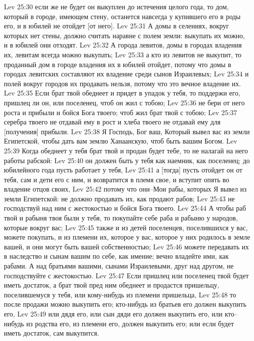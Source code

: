 Lev 25:30  если же не будет он выкуплен до истечения целого года, то дом, который в городе, имеющем стену, останется навсегда у купившего его в роды его, и в юбилей не отойдет [от него].
Lev 25:31  А домы в селениях, вокруг которых нет стены, должно считать наравне с полем земли: выкупать их можно, и в юбилей они отходят.
Lev 25:32  А города левитов, домы в городах владения их, левитам всегда можно выкупать;
Lev 25:33  а кто из левитов не выкупит, то проданный дом в городе владения их в юбилей отойдет, потому что домы в городах левитских составляют их владение среди сынов Израилевых;
Lev 25:34  и полей вокруг городов их продавать нельзя, потому что это вечное владение их.
Lev 25:35  Если брат твой обеднеет и придет в упадок у тебя, то поддержи его, пришлец ли он, или поселенец, чтоб он жил с тобою;
Lev 25:36  не бери от него роста и прибыли и бойся Бога твоего; чтоб жил брат твой с тобою;
Lev 25:37  серебра твоего не отдавай ему в рост и хлеба твоего не отдавай ему для [получения] прибыли.
Lev 25:38  Я Господь, Бог ваш, Который вывел вас из земли Египетской, чтобы дать вам землю Ханаанскую, чтоб быть вашим Богом.
Lev 25:39  Когда обеднеет у тебя брат твой и продан будет тебе, то не налагай на него работы рабской:
Lev 25:40  он должен быть у тебя как наемник, как поселенец; до юбилейного года пусть работает у тебя,
Lev 25:41  а [тогда] пусть отойдет он от тебя, сам и дети его с ним, и возвратится в племя свое, и вступит опять во владение отцов своих,
Lev 25:42  потому что они--Мои рабы, которых Я вывел из земли Египетской: не должно продавать их, как продают рабов;
Lev 25:43  не господствуй над ним с жестокостью и бойся Бога твоего.
Lev 25:44  А чтобы раб твой и рабыня твоя были у тебя, то покупайте себе раба и рабыню у народов, которые вокруг вас;
Lev 25:45  также и из детей поселенцев, поселившихся у вас, можете покупать, и из племени их, которое у вас, которое у них родилось в земле вашей, и они могут быть вашей собственностью;
Lev 25:46  можете передавать их в наследство и сынам вашим по себе, как имение; вечно владейте ими, как рабами. А над братьями вашими, сынами Израилевыми, друг над другом, не господствуйте с жестокостью.
Lev 25:47  Если пришлец или поселенец твой будет иметь достаток, а брат твой пред ним обеднеет и продастся пришельцу, поселившемуся у тебя, или кому-нибудь из племени пришельца,
Lev 25:48  то после продажи можно выкупить его; кто-нибудь из братьев его должен выкупить его,
Lev 25:49  или дядя его, или сын дяди его должен выкупить его, или кто-- нибудь из родства его, из племени его, должен выкупить его; или если будет иметь достаток, сам выкупится.
